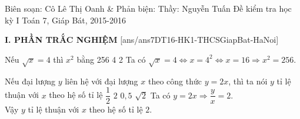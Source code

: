 
	\begin{name}
		{Biên soạn: Cô Lê Thị Oanh \& Phản biện: Thầy: Nguyễn Tuấn}
		{Đề kiểm tra học kỳ I Toán 7, Giáp Bát, 2015-2016}
	\end{name}
	\noindent\textbf{I. PHẦN TRẮC NGHIỆM}
	\setcounter{ex}{0}
	[ans/ans7DT16-HK1-THCSGiapBat-HaNoi]
		\begin{ex}%
			Nếu $\sqrt{x}=4$ thì $x^2$ bằng
			\choice
			{256}
			{}
			{4}
			{2}
			\loigiai
			{
				Ta có $\sqrt{x}=4 \Leftrightarrow x=4^2 \Leftrightarrow x=16 \Rightarrow x^2=256$.
			}
		\end{ex}
	
		\begin{ex}%
		Nếu đại lượng $y$ liên hệ với đại lượng $x$ theo công thức $y=2x$, thì ta nói $y$ tỉ lệ thuận với $x$ theo hệ số tỉ lệ
		\choice
		{$\dfrac{1}{2}$}
		{\True $2$}
		{$0{,}5$}
		{$\sqrt{2}$}
		\loigiai
		{
			Ta có $y=2x \Rightarrow \dfrac{y}{x}=2$.\\
			Vậy $y$ tỉ lệ thuận với $x$ theo hệ số tỉ lệ $2$.
		}
	\end{ex}

